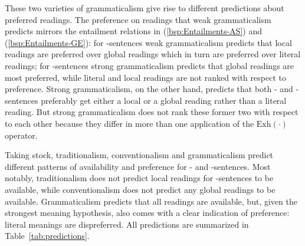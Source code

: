 \documentclass[fleqn,reqno,10pt,draft]{article}
\newcommand{\as}{\acro{as}}
\renewcommand{\es}{\acro{es}}
\newcommand{\exh}{\ensuremath{\mathrm{Exh}}}
\begin{document}
These two varieties of grammaticalism give rise to different
predictions about preferred readings. The preference on readings that
weak grammaticalism predicts mirrors the entailment relations in
(\ref{bsp:Entailments-AS}) and (\ref{bsp:Entailments-GE}): for
\as-sentences weak grammaticalism predicts that local readings are
preferred over global readings which in turn are preferred over
literal readings; for \es-sentences strong grammaticalism predicts
that global readings are most preferred, while literal and local
readings are not ranked with respect to preference. Strong
grammaticalism, on the other hand, predicts that both \as- and
\es-sentences preferably get either a local or a global reading rather
than a literal reading. But strong grammaticalism does not rank these
former two with respect to each other because they differ in more than
one application of the $\exh(\cdot)$ operator. 

\medskip

Taking stock, traditionalism, conventionalism and grammaticalism
predict different patterns of availability and preference for \as- and
\es-sentences. Most notably, traditionalism does not predict local
readings for \es-sentences to be available, while conventionalism does
not predict any global readings to be available. Grammaticalism
predicts that all readings are available, but, given the strongest
meaning hypothesis, also comes with a clear indication of preference:
literal meanings are dispreferred. All predictions are summarized in
Table~\ref{tab:predictions}.
\end{document}
